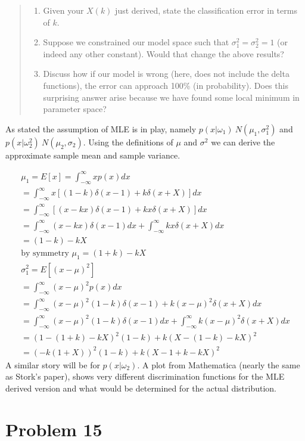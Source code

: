 \documentclass[11pt]{article}
\begin{document}
\begin{quote}
\begin{enumerate}
	\item Given your $X(k)$ just derived, state the classification error in terms of $k$.  
	\item Suppose we constrained our model space such that $\sigma_1 ^2 = \sigma _2 ^2 =1 $ (or indeed any other constant).  Would that change the above results?
	\item Discuss how if our model is wrong (here, does not include the delta functions), the error can approach  100\% (in probability).  Does this surprising answer arise because we have found some local minimum in parameter space? 
\end{enumerate}

\end{quote}

As stated the assumption of MLE is in play, namely $p(x | \omega_1) ~N(\mu_1 , \sigma^2 _1)$ and $p(x | \omega^2 _2) ~N(\mu_2 , \sigma_2)$.  %
Using the definitions of $\mu$ and $\sigma^2$ we can derive the approximate sample mean and sample variance. 

\begin{eqnarray}	
	\mu_1 = E[x] = \int_{-\infty} ^{\infty}  x p(x) dx \\
	= \int_{-\infty} ^{\infty}  x [(1-k)\delta (x-1) + k \delta(x + X)] dx \\
	= \int_{-\infty} ^{\infty}   [(x-kx)\delta (x-1) + kx \delta(x + X) ] dx \\
	= \int_{-\infty} ^{\infty}   (x-kx)\delta (x-1) dx + \int_{-\infty} ^{\infty} kx \delta(x + X)  dx \\
	=  (1 - k) - kX  \\
	\textrm{by symmetry } \mu_1 =  (1 + k) - kX  \\
	\sigma^2_1 = E[(x-\mu)^2]  \\
	= \int _{-\infty} ^{\infty} (x-\mu)^2 p(x) dx \\
	= \int _{-\infty} ^{\infty} (x-\mu)^2 (1-k)\delta (x-1) + k (x-\mu)^2 \delta(x + X) dx \\
	= \int _{-\infty} ^{\infty} (x-\mu)^2 (1-k)\delta (x-1) dx +  \int _{-\infty} ^{\infty} k (x-\mu)^2 \delta(x + X) dx\\
	=  (1-(1 + k) - kX)^2 (1-k)  +   k (X-(1 - k) - kX)^2   \\
	=  (-k(1 + X) )^2 (1-k)  +   k (X-1 + k - kX)^2 
\end{eqnarray}
A similar story will be for $p(x | \omega_2)$.  A plot from Mathematica (nearly the same as Stork's paper), shows very different discrimination functions for the MLE derived version and what would be determined for the actual distribution.  


\section{Problem 15}



\end{document}
